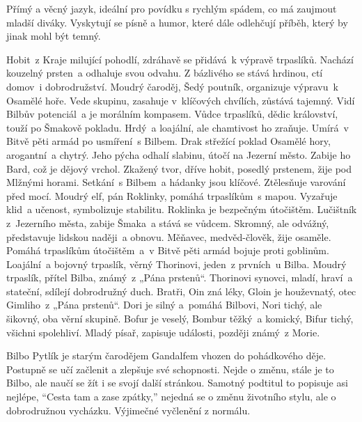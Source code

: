 \documentclass[FGBook.tex]{subfiles}
\begin{document}


\noindent Přímý a věcný jazyk, ideální pro povídku s rychlým spádem, co má zaujmout mladší diváky.
Vyskytují se písně a humor, které dále odlehčují příběh, který by jinak mohl být temný.

\noindent 
{} Hobit~z Kraje milující pohodlí,
zdráhavě se přidává~k výpravě trpaslíků.
Nachází kouzelný prsten~a odhaluje svou odvahu.
Z bázlivého se stává hrdinou, ctí domov~i dobrodružství.
 Moudrý čaroděj, Šedý poutník, organizuje výpravu~k Osamělé hoře.
Vede skupinu, zasahuje v~klíčových chvílích, zůstává tajemný.
Vidí Bilbův potenciál~a je morálním kompasem.
 Vůdce trpaslíků, dědic království, touží po Šmakově pokladu.
Hrdý~a loajální, ale chamtivost ho zraňuje.
Umírá~v Bitvě pěti armád po usmíření~s Bilbem.
 Drak střežící poklad Osamělé hory, arogantní~a chytrý.
Jeho pýcha odhalí slabinu, útočí na Jezerní město.
Zabije ho Bard, což je dějový vrchol.
 Zkažený tvor, dříve hobit, posedlý prstenem, žije pod Mlžnými horami.
Setkání~s Bilbem~a hádanky jsou klíčové.
Ztělesňuje varování před mocí.
 Moudrý elf, pán Roklinky, pomáhá trpaslíkům~s mapou.
Vyzařuje klid~a učenost, symbolizuje stabilitu.
Roklinka je bezpečným útočištěm.
 Lučištník z~Jezerního města, zabije Šmaka~a stává se vůdcem.
Skromný, ale odvážný, představuje lidskou naději~a obnovu.
 Měňavec, medvěd-člověk, žije osaměle.
Pomáhá trpaslíkům útočištěm~a~v Bitvě pěti armád bojuje proti goblinům.
 Loajální~a bojovný trpaslík, věrný Thorinovi, jeden~z prvních~u Bilba.
 Moudrý trpaslík, přítel Bilba, známý~z „Pána prstenů“.
 Thorinovi synovci, mladí, hraví~a stateční,
sdílejí dobrodružný duch.
 Bratři, Oin zná léky, Gloin je houževnatý,
otec Gimliho~z „Pána prstenů“.
 Dori je silný a~pomáhá Bilbovi, Nori tichý, ale šikovný,
oba věrní skupině.
 Bofur je veselý, Bombur těžký~a komický,
Bifur tichý, všichni spolehliví.
 Mladý písař, zapisuje události, později známý~z Morie.

\noindent 
Bilbo Pytlík je starým čarodějem Gandalfem vhozen do pohádkového děje.
Postupně se učí začlenit a zlepšuje své schopnosti.
Nejde o změnu, stále je to Bilbo, ale naučí se žít i se svojí další stránkou.
Samotný podtitul to popisuje asi nejlépe, \enquote{Cesta tam a zase zpátky,} nejedná se o změnu životního stylu, ale o dobrodružnou vycházku.
Výjimečné vyčlenění z normálu.
\end{document}
